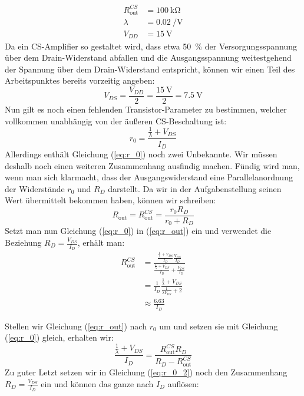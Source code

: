 \documentclass[11pt,a4paper,titlepage]{article}
\begin{document}
\begin{equation*}
\begin{aligned}
R_\text{out}^{CS} &= \SI{100}{\kilo\ohm}\\
\lambda &= \SI{0.02}{\per\volt}\\
V_{DD} &= \SI{15}{\volt}
\end{aligned}
\end{equation*}
Da ein CS-Amplifier so gestaltet wird, dass etwa \SI{50}{\percent} der Versorgungsspannung über dem Drain-Widerstand abfallen und die Ausgangsspannung weitestgehend der Spannung über dem Drain-Widerstand entspricht, können wir einen Teil des Arbeitspunktes bereits vorzeitig angeben:
\[V_{DS} = \frac{V_{DD}}{2} = \frac{\SI{15}{\volt}}{2} = \SI{7.5}{\volt}\]
Nun gilt es noch einen fehlenden Transistor-Parameter zu bestimmen, welcher vollkommen unabhängig von der äußeren CS-Beschaltung ist:
\begin{equation}\label{eq:r_0} 
r_0 = \frac{\frac{1}{\lambda}+V_{DS}}{I_D}
\end{equation}
Allerdings enthält Gleichung (\ref{eq:r_0}) noch zwei Unbekannte. Wir müssen deshalb noch einen weiteren Zusammenhang ausfindig machen. Fündig wird man, wenn man sich klarmacht, dass der Ausgangswiderstand eine Parallelanordnung der Widerstände $r_0$ und $R_D$ darstellt. Da wir in der Aufgabenstellung seinen Wert übermittelt bekommen haben, können wir schreiben:
\begin{equation}\label{eq:r_out} 
R_\text{out} = R_{\text{out}}^{CS} = \frac{r_0 R_D}{r_0+R_D}
\end{equation}
Setzt man nun Gleichung (\ref{eq:r_0}) in (\ref{eq:r_out}) ein und verwendet die Beziehung $R_D=\frac{V_{DS}}{I_D}$, erhält man:
\begin{equation}
\begin{aligned}
R_\text{out}^{CS} &= \frac{\frac{\frac{1}{\lambda}+V_{DS}}{I_D}\frac{V_{DS}}{I_D}}{\frac{\frac{1}{\lambda}+V_{DS}}{I_D}+\frac{V_{DS}}{I_D}} \\
&= \frac{1}{I_D}\frac{\frac{1}{\lambda}+V_{DS}}{\frac{1}{\lambda V_{DS}}+2} \\
&\approx \frac{6.63}{I_D}
\end{aligned}
\end{equation}


Stellen wir Gleichung (\ref{eq:r_out}) nach $r_0$ um und setzen sie mit Gleichung (\ref{eq:r_0}) gleich, erhalten wir:
\begin{equation}\label{eq:r_0_2} 
\frac{\frac{1}{\lambda}+V_{DS}}{I_D} = \frac{R_{\text{out}}^{CS}R_D}{R_D-R_{\text{out}}^{CS}}
\end{equation}
Zu guter Letzt setzen wir in Gleichung (\ref{eq:r_0_2}) noch den Zusammenhang $R_D=\frac{V_{DS}}{I_D}$ ein und können das ganze nach $I_D$ auflösen:
\end{document}
